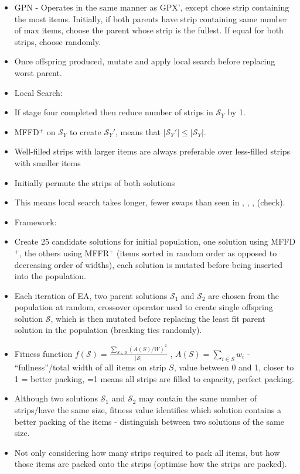 \documentclass{elsarticle}
\begin{document}
\begin{itemize}
	\item GPN - Operates in the same manner as GPX', except chose strip containing the most items. Initially, if both parents have strip containing same number of max items, choose the parent whose strip is the fullest. If equal for both strips, choose randomly.
	\item Once offspring produced, mutate and apply local search before replacing worst parent.
	\item Local Search:
	\item If stage four completed then reduce number of strips in $\mathcal{S}_Y$ by 1.
	\item MFFD$^+$ on $\mathcal{S}_Y$ to create $\mathcal{S}_Y'$, means that $|\mathcal{S}_Y'| \leq |\mathcal{S}_Y|$.
	\item Well-filled strips with larger items are always preferable over less-filled strips with smaller items \cite{levine2004}
	\item Initially permute the strips of both solutions
	\item This means local search takes longer, fewer swaps than seen in \cite{lewis2009}, \cite{lewis2017}, \cite{levine2004}, \cite{falkenauer1996} (check).
	\item Framework:
	\item Create 25 candidate solutions for initial population, one solution using MFFD$^+$, the others using MFFR$^+$ (items sorted in random order as opposed to decreasing order of widths), each solution is mutated before being inserted into the population.
	\item Each iteration of EA, two parent solutions $\mathcal{S}_1$ and $\mathcal{S}_2$ are chosen from the population at random, crossover operator used to create single offspring solution $\mathcal{S}$, which is then mutated before replacing the least fit parent solution in the population (breaking ties randomly).
	\item Fitness function $f(\mathcal{S}) = \frac{\sum_{S \in \mathcal{S}} (A(S)/W)^2}{|\mathcal{S}|}$ \cite{falkenauer1992}, $A(S) = \sum_{i \in S} w_i$ - ``fullness''/total width of all items on strip $S$, value between 0 and 1, closer to 1 = better packing, =1 means all strips are filled to capacity, perfect packing.
	\item Although two solutions $\mathcal{S}_1$ and $\mathcal{S}_2$ may contain the same number of strips/have the same size, fitness value identifies which solution contains a better packing of the items - distinguish between two solutions of the same size.
	\item Not only considering how many strips required to pack all items, but how those items are packed onto the strips (optimise how the strips are packed).

\end{itemize}
\end{document}
